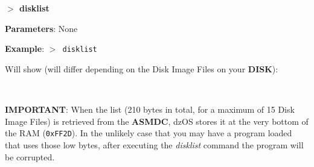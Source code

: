 \documentclass[a4paper,11pt]{article}
\begin{document}
        \hspace{1.9cm}\textbf{$>$ disklist}

        \textbf{Parameters}: None

        \textbf{Example}: \texttt{$>$ disklist}

        Will show (will differ depending on the Disk Image Files on your
        \textbf{DISK}):

        \texttt{
        }

        \textbf{IMPORTANT}: When the list (210 bytes in total, for a maximum of
        15 Disk Image Files) is retrieved from the \textbf{ASMDC}, dzOS stores
        it at the very bottom of the RAM (\texttt{0xFF2D}). In the unlikely case
        that you may have a program loaded that uses those low bytes, after
        executing the \textit{disklist} command the program will be corrupted.


        
        

        
\end{document}
